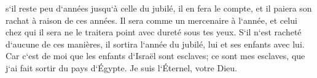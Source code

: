 \verse s`il reste peu d`années jusqu`à celle du jubilé, il en fera le compte, et il paiera son rachat à raison de ces années. 
\verse Il sera comme un mercenaire à l`année, et celui chez qui il sera ne le traitera point avec dureté sous tes yeux. 
\verse S`il n`est racheté d`aucune de ces manières, il sortira l`année du jubilé, lui et ses enfants avec lui. 
\verse Car c`est de moi que les enfants d`Israël sont esclaves; ce sont mes esclaves, que j`ai fait sortir du pays d`Égypte. Je suis l`Éternel, votre Dieu. 

\chapter{}

